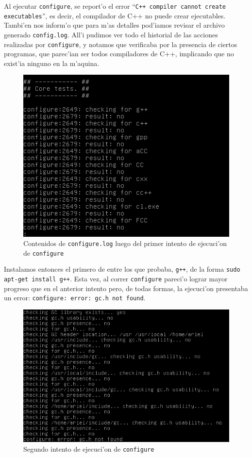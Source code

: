 \documentclass[11pt]{article}
\begin{document}
		Al ejecutar \texttt{configure}, se report'o el error ``\texttt{C++ compiler cannot create executables}'', es decir, el compilador de C++ no puede crear ejecutables. Tambi'en nos inform'o que para m'as detalles pod'iamos revisar el archivo generado \texttt{config.log}. All'i pudimos ver todo el historial de las acciones realizadas por \texttt{configure}, y notamos que verificaba por la presencia de ciertos programas, que parec'ian ser todos compiladores de C++, implicando que no exist'ia ninguno en la m'aquina.
		
		\begin{figure}[H]
			\centering \captionsetup{justification=centering}
			\includegraphics[width=.7\linewidth]{Images/Compile_w3m/g++_missing_log}
			\caption{Contenidos de \texttt{configure.log} luego del primer intento de ejecuci'on de \texttt{configure}}
			\label{fig:g++_missing_log}
		\end{figure}
		
		Instalamos entonces el primero de entre los que probaba, \texttt{g++}, de la forma \texttt{sudo apt-get install g++}. Esta vez, al correr \texttt{configure} pareci'o lograr mayor progreso que en el anterior intento pero, de todas formas, la ejecuci'on presentaba un error: \texttt{configure: error: gc.h not found}.
		
		\begin{figure}[H]
			\centering \captionsetup{justification=centering}
			\includegraphics[width=.8\linewidth]{Images/Compile_w3m/gc_missing}
			\caption{Segundo intento de ejecuci'on de \texttt{configure}}
			\label{fig:gc_missing}
		\end{figure}
		
\end{document}
